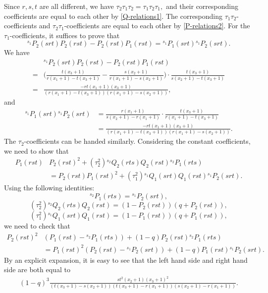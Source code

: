 \documentclass[11pt, reqno]{amsart} \textwidth=14.9cm \oddsidemargin=1cm \evensidemargin=1cm
\theoremstyle{definition}
\numberwithin{equation}{section}
\begin{document}
Since $r,s, t$ are all different, we have $\tau_2\tau_1\tau_2=\tau_1\tau_2\tau_1,$ and their corresponding coefficients are equal to each other by \eqref{Q-relations1}. The corresponding $\tau_1\tau_2$-coefficients and $\tau_2\tau_1$-coefficients are equal to each other by \eqref{P-relations2}. For the $\tau_1$-coefficients, it suffices to prove that
\begin{equation*}
{}^{s_{1}}P_2(srt)P_2(rst)-P_2(rst)P_1(rst)={}^{s_{1}}P_1(srt){}^{s_{1}}P_2(srt).
\end{equation*}
We have
\begin{align*}
&{}^{s_{1}}P_2(srt)P_2(rst)-P_2(rst)P_1(rst)\\=&\big(\frac{t(x_{3}+1)}{r(x_{1}+1)-t(x_{3}+1)}-\frac{s(x_{2}+1)}{r(x_{1}+1)-s(x_{2}+1)}\big)\cdot \frac{t(x_{3}+1)}{s(x_{2}+1)-t(x_{3}+1)}\\
=&\frac{-rt(x_1+1)(x_3+1)}{(r(x_{1}+1)-t(x_{3}+1))(r(x_{1}+1)-s(x_{2}+1))},
\end{align*}
and
\begin{align*}
{}^{s_{1}}P_1(srt){}^{s_{1}}P_2(srt)&=\frac{r(x_1+1)}{s(x_{2}+1)-r(x_{1}+1)}\cdot \frac{t(x_{3}+1)}{r(x_{1}+1)-t(x_{3}+1)}\\
&=\frac{-rt(x_1+1)(x_3+1)}{(r(x_{1}+1)-t(x_{3}+1))(r(x_{1}+1)-s(x_{2}+1))}.
\end{align*}
The $\tau_2$-coefficients can be handed similarly. Considering the constant coefficients, we need to show that
\begin{align*}
P_1(rst)&P_2(rst)^{2}+(\tau_2^{2}){}^{s_{2}}Q_2(rts)Q_2(rst){}^{s_{2}}P_1(rts)\\
&=P_2(rst)P_1(rst)^{2}+(\tau_1^{2}){}^{s_{1}}Q_1(srt)Q_1(rst){}^{s_{1}}P_2(srt).
\end{align*}
Using the following identities:
$$
{}^{s_{2}}P_1(rts)={}^{s_{1}}P_2(srt),
$$$$
(\tau_2^{2}){}^{s_{2}}Q_2(rts)Q_2(rst)=(1-P_{2}(rst))(q+P_{2}(rst)),
$$
$$
(\tau_1^{2}){}^{s_{1}}Q_1(srt)Q_1(rst)=(1-P_{1}(rst))(q+P_{1}(rst)),
$$
we need to check that
\begin{align*}
P_2(rst)^{2}&(P_1(rst)-{}^{s_{2}}P_1(rts))+(1-q)P_2(rst){}^{s_{2}}P_1(rts)\\&=P_1(rst)^{2}(P_2(rst)-{}^{s_{1}}P_2(srt))+(1-q)P_1(rst){}^{s_{1}}P_2(srt).
\end{align*}
By an explicit expansion, it is easy to see that the left hand side and right hand side are both equal to
\begin{align*}
(1-q)^{3}\frac{st^{2}(x_2+1)(x_{3}+1)^{2}}{(t(x_{3}+1)-s(x_{2}+1))(t(x_{3}+1)-r(x_{1}+1))(s(x_{2}+1)-r(x_{1}+1))}.
\end{align*}
\end{document}
